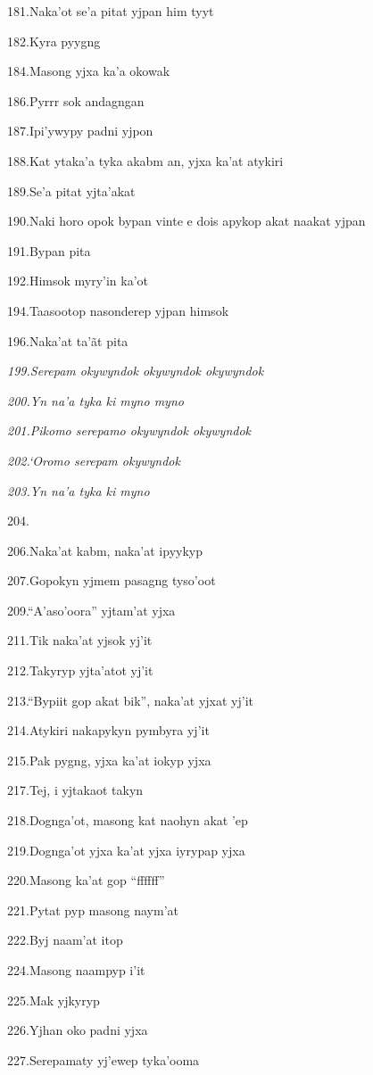 181.Naka'ot se'a pitat yjpan him tyyt

182.Kyra pyygng

184.Masong yjxa ka'a okowak

186.Pyrrr sok andagngan

187.Ipi'ywypy padni yjpon

188.Kat ytaka'a tyka akabm an, yjxa ka'at atykiri

189.Se'a pitat yjta'akat

190.Naki horo opok bypan vinte e dois apykop akat naakat yjpan

191.Bypan pita

192.Himsok myry'in ka'ot

194.Taasootop nasonderep yjpan himsok

196.Naka'at ta'ãt pita

\emph{199.Serepam okywyndok okywyndok okywyndok}

\emph{200.Yn na'a tyka ki myno myno}

\emph{201.Pikomo serepamo okywyndok okywyndok}

\emph{202.`Oromo serepam okywyndok}

\emph{203.Yn na'a tyka ki myno}

204.

206.Naka'at kabm, naka'at ipyykyp

207.Gopokyn yjmem pasagng tyso'oot

209.``A'aso'oora'' yjtam'at yjxa

211.Tik naka'at yjsok yj'it

212.Takyryp yjta'atot yj'it

213.``Bypiit gop akat bik'', naka'at yjxat yj'it

214.Atykiri nakapykyn pymbyra yj'it

215.Pak pygng, yjxa ka'at iokyp yjxa

217.Tej, i yjtakaot takyn

218.Dognga'ot, masong kat naohyn akat 'ep

219.Dognga'ot yjxa ka'at yjxa iyrypap yjxa

220.Masong ka'at gop ``ffffff''

221.Pytat pyp masong naym'at

222.Byj naam'at itop

224.Masong naampyp i'it

225.Mak yjkyryp

226.Yjhan oko padni yjxa

227.Serepamaty yj'ewep tyka'ooma

